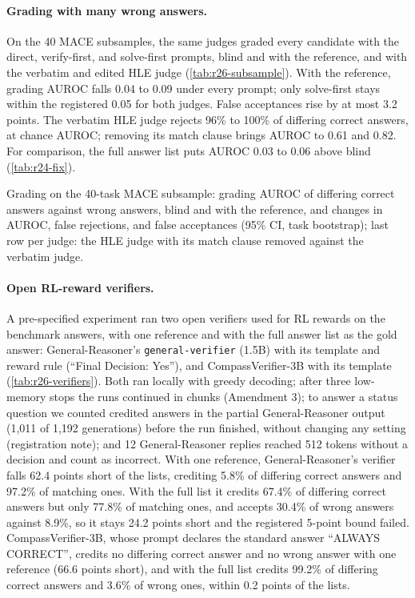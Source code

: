 \paragraph{Grading with many wrong answers.} On the 40 \textsc{MACE} subsamples, the same judges graded every candidate with the direct, verify-first, and solve-first prompts, blind and with the reference, and with the verbatim and edited HLE judge (\cref{tab:r26-subsample}). With the reference, grading AUROC falls 0.04 to 0.09 under every prompt; only solve-first stays within the registered 0.05 for both judges. False acceptances rise by at most 3.2 points. The verbatim HLE judge rejects 96\% to 100\% of differing correct answers, at chance AUROC; removing its match clause brings AUROC to 0.61 and 0.82. For comparison, the full answer list puts AUROC 0.03 to 0.06 above blind (\cref{tab:r24-fix}).

\begin{table}[htbp]
\centering
\caption{Grading on the 40-task \textsc{MACE} subsample: grading AUROC of differing correct answers against wrong answers, blind and with the reference, and changes in AUROC, false rejections, and false acceptances (95\% CI, task bootstrap); last row per judge: the HLE judge with its match clause removed against the verbatim judge.\pre}
\label{tab:r26-subsample}
\footnotesize
\setlength{\tabcolsep}{3pt}
\begin{adjustbox}{max width=\linewidth}\end{adjustbox}
\end{table}

\paragraph{Open RL-reward verifiers.} A pre-specified experiment ran two open verifiers used for RL rewards on the benchmark answers, with one reference and with the full answer list as the gold answer: General-Reasoner's \texttt{general-verifier} (1.5B) with its template and reward rule (``Final Decision: Yes''), and CompassVerifier-3B with its template (\cref{tab:r26-verifiers}). Both ran locally with greedy decoding; after three low-memory stops the runs continued in chunks (Amendment 3); to answer a status question we counted credited answers in the partial General-Reasoner output (1,011 of 1,192 generations) before the run finished, without changing any setting (registration note); and 12 General-Reasoner replies reached 512 tokens without a decision and count as incorrect. With one reference, General-Reasoner's verifier falls 62.4 points short of the lists, crediting 5.8\% of differing correct answers and 97.2\% of matching ones. With the full list it credits 67.4\% of differing correct answers but only 77.8\% of matching ones, and accepts 30.4\% of wrong answers against 8.9\%, so it stays 24.2 points short and the registered 5-point bound failed. CompassVerifier-3B, whose prompt declares the standard answer ``ALWAYS CORRECT'', credits no differing correct answer and no wrong answer with one reference (66.6 points short), and with the full list credits 99.2\% of differing correct answers and 3.6\% of wrong ones, within 0.2 points of the lists.

